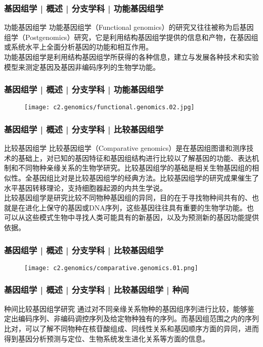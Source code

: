 \begin{frame}
  \frametitle{基因组学 | 概述 | 分支学科 | 功能基因组学}
  \begin{block}{功能基因组学}
功能基因组学（Functional genomics）的研究又往往被称为后基因组学（Postgenomics）研究，它是利用结构基因组学提供的信息和产物，在基因组或系统水平上全面分析基因的功能和相互作用。\\
\vspace{1em}
功能基因组学是利用结构基因组学所获得的各种信息，建立与发展各种技术和实验模型来测定基因及基因非编码序列的生物学功能。
  \end{block}
\end{frame}

\begin{frame}
  \frametitle{基因组学 | 概述 | 分支学科 | 功能基因组学}
  \begin{figure}
    \centering
    \texttt{[image: c2.genomics/functional.genomics.02.jpg]}
  \end{figure}
\end{frame}

\begin{frame}
  \frametitle{基因组学 | 概述 | 分支学科 | 比较基因组学}
  \begin{block}{比较基因组学}
比较基因组学（Comparative genomics）是在基因组图谱和测序技术的基础上，对已知的基因特征和基因组结构进行比较以了解基因的功能、表达机制和不同物种亲缘关系的生物学研究。比较基因组学的基础是相关生物基因组的相似性。全基因组比对是比较基因组学的经典方法。比较基因组学的研究成果催生了水平基因转移理论，支持细胞器起源的内共生学说。\\
\vspace{1em}
比较基因组学是研究比较不同物种基因组的异同，目的在于寻找物种间共有的、也就是在进化上保守的基因或DNA序列，这些基因往往具有重要的生物学功能。也可以从这些模式生物中寻找人类可能具有的新基因，以及为预测新的基因功能提供依据。
  \end{block}
\end{frame}

\begin{frame}
  \frametitle{基因组学 | 概述 | 分支学科 | 比较基因组学}
  \begin{figure}
    \centering
    \texttt{[image: c2.genomics/comparative.genomics.01.png]}
  \end{figure}
\end{frame}

\begin{frame}
  \frametitle{基因组学 | 概述 | 分支学科 | 比较基因组学 | 种间}
  \begin{block}{种间比较基因组学研究}
通过对不同亲缘关系物种的基因组序列进行比较，能够鉴定出编码序列、非编码调控序列及给定物种独有的序列。而基因组范围之内的序列比对，可以了解不同物种在核苷酸组成、同线性关系和基因顺序方面的异同，进而得到基因分析预测与定位、生物系统发生进化关系等方面的信息。
  \end{block}
\end{frame}

